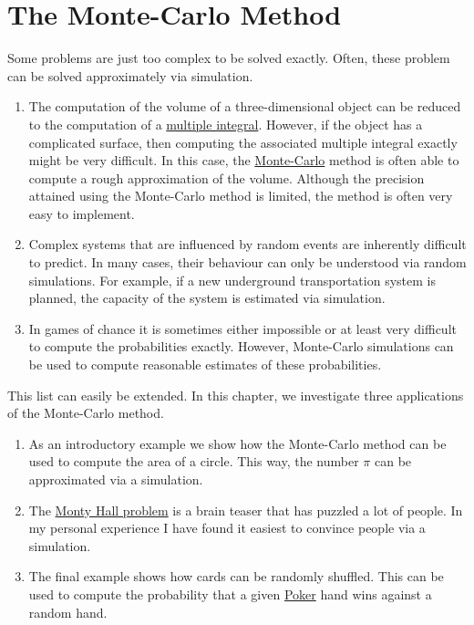 \chapter{The Monte-Carlo Method}
Some problems are just too complex to be solved exactly.  Often, these problem can be solved approximately via simulation.
\begin{enumerate}
\item The computation of the volume of a three-dimensional object can be reduced to the computation of a
      \href{https://en.wikipedia.org/wiki/Multiple_integral}{multiple integral}.
      However, if the object has a complicated surface, then computing the associated multiple integral exactly
      might be very difficult.
      In this case, the \href{https://en.wikipedia.org/wiki/Monte_Carlo_integration}{Monte-Carlo} method is
      often able to compute a rough approximation of the volume.  Although the precision attained using the Monte-Carlo
      method is limited, the method is often very easy to implement.
\item Complex systems that are influenced by random events are inherently difficult to predict.  In many cases,
      their behaviour can only be understood via random simulations.  For example, if a new underground transportation system
      is planned, the capacity of the system is estimated via simulation.
\item In games of chance it is sometimes either impossible or at least very difficult to compute the
      probabilities exactly.  However, Monte-Carlo simulations can be used to compute reasonable estimates of these probabilities.
\end{enumerate}
This list can easily be extended.  In this chapter, we investigate three applications of the Monte-Carlo method.
\begin{enumerate}
\item As an introductory example we show how the Monte-Carlo method can be used to compute the area of a
      circle.  This way, the number \href{https://en.wikipedia.org/wiki/Pi}{$\pi$} can be approximated via a simulation.
\item The \href{https://en.wikipedia.org/wiki/Monty_Hall_problem}{Monty Hall problem} is a brain teaser that
      has puzzled a lot of people.  In my personal experience I have found it easiest to convince people via
      a simulation.
\item The final example shows how cards can be randomly shuffled.  This can be used to compute the probability
      that a given \href{https://en.wikipedia.org/wiki/Poker}{Poker} hand wins against a random hand.
\end{enumerate}

